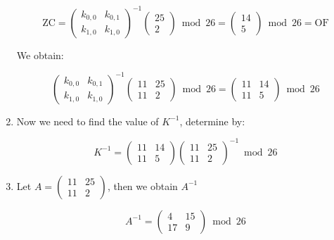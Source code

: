 \documentclass[titlepage, 12pt]{article}
\numberwithin{equation}{section}%
\numberwithin{figure}{section}%
\numberwithin{table}{section}%
\begin{document}
\begin{enumerate}
		\begin{equation}
			\text{ZC} = 
			\begin{pmatrix}
			k_{0,0} & k_{0,1} \\
			k_{1,0} & k_{1,0}
			\end{pmatrix}^{-1}
			\begin{pmatrix}
				25 \\
				2
			\end{pmatrix}
			\bmod{26} = 
			\begin{pmatrix}
				14 \\
				5
			\end{pmatrix}
			\bmod{26} = \text{OF}
		\end{equation}
		
		We obtain:
		
		\begin{equation}
			\begin{pmatrix}
			k_{0,0} & k_{0,1} \\
			k_{1,0} & k_{1,0}
			\end{pmatrix}^{-1}
			\begin{pmatrix}
			11 & 25 \\
			11 & 2
			\end{pmatrix}
			\bmod{26} = 
			\begin{pmatrix}
			11 & 14 \\
			11 & 5 
			\end{pmatrix}
			\bmod{26}
		\end{equation}
		
		\item Now we need to find the value of $K^{-1}$, determine by:
		
		\begin{equation}
			K^{-1} = 
			\begin{pmatrix}
			11 & 14 \\
			11 & 5
			\end{pmatrix}
			\begin{pmatrix}
			11 & 25 \\
			11 & 2
			\end{pmatrix}^{-1}
			\bmod{26}
		\end{equation}
		
		\item Let $ A = \left(\begin{smallmatrix}
		11 & 25 \\
		11 & 2
		\end{smallmatrix}\right)$, then we obtain $A^{-1}$ 
		
		\begin{equation}
			A^{-1} = \begin{pmatrix}
			4 & 15 \\
			17 & 9
			\end{pmatrix}\bmod{26}
		\end{equation}
		

\end{enumerate}
\end{document}
